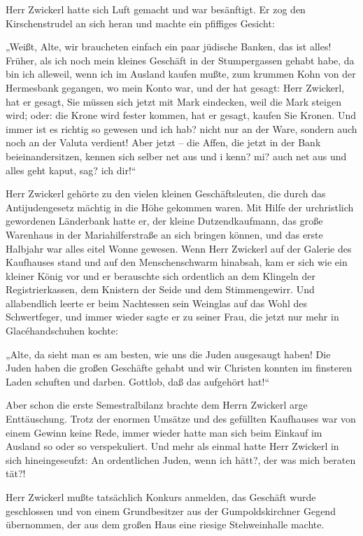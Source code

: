 Herr Zwickerl hatte sich Luft gemacht und war
besänftigt. Er zog den Kirschenstrudel an sich heran und machte ein
pfiffiges Gesicht:

„Weißt, Alte, wir braucheten einfach ein paar jüdische Banken, das
ist alles! Früher, als ich noch mein kleines Geschäft in der
Stumpergassen gehabt habe, da bin ich alleweil, wenn ich im Ausland
kaufen mußte, zum krummen Kohn von der Hermesbank gegangen, wo mein
Konto war, und der hat gesagt: Herr Zwickerl, hat er gesagt, Sie
müssen sich jetzt mit Mark eindecken, weil die Mark steigen wird;
oder: die Krone wird fester kommen, hat er gesagt, kaufen Sie
Kronen. Und immer ist es richtig so gewesen und ich hab? nicht nur
an der Ware, sondern auch noch an der Valuta verdient! Aber jetzt –
die Affen, die jetzt in der Bank beieinandersitzen, kennen sich
selber net aus und i kenn? mi? auch net aus und alles geht kaput,
sag? ich dir!“

Herr Zwickerl gehörte zu den vielen kleinen Geschäftsleuten, die
durch das Antijudengesetz mächtig in die Höhe gekommen waren. Mit
Hilfe der urchristlich gewordenen Länderbank hatte er, der kleine
Dutzendkaufmann, das große Warenhaus in der Mariahilferstraße an
sich bringen können, und das erste Halbjahr war alles eitel Wonne
gewesen. Wenn Herr Zwickerl auf der Galerie des Kaufhauses stand
und auf den Menschenschwarm hinabsah, kam er sich wie ein kleiner
König vor und er berauschte sich ordentlich an dem Klingeln der
Registrierkassen, dem Knistern der Seide und dem Stimmengewirr. Und
allabendlich leerte er beim Nachtessen sein Weinglas auf das
 Wohl des Schwertfeger, und immer wieder sagte er zu
seiner Frau, die jetzt nur mehr in Glacéhandschuhen kochte:

„Alte, da sieht man es am besten, wie uns die Juden ausgesaugt
haben! Die Juden haben die großen Geschäfte gehabt und wir Christen
konnten im finsteren Laden schuften und darben. Gottlob, daß das
aufgehört hat!“

Aber schon die erste Semestralbilanz brachte dem Herrn Zwickerl
arge Enttäuschung. Trotz der enormen Umsätze und des gefüllten
Kaufhauses war von einem Gewinn keine Rede, immer wieder hatte man
sich beim Einkauf im Ausland so oder so verspekuliert. Und mehr als
einmal hatte Herr Zwickerl in sich hineingeseufzt: An ordentlichen
Juden, wenn ich hätt?, der was mich beraten tät?!

Herr Zwickerl mußte tatsächlich Konkurs anmelden, das Geschäft
wurde geschlossen und von einem Grundbesitzer aus der
Gumpoldskirchner Gegend übernommen, der aus dem großen Haus eine
riesige Stehweinhalle machte.

